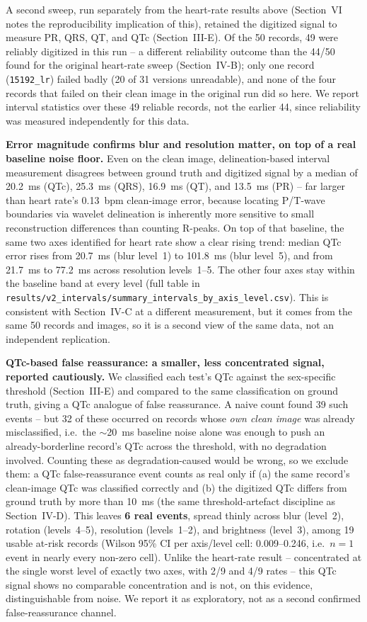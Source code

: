 \documentclass[conference]{IEEEtran}
\begin{document}
A second sweep, run separately from the heart-rate results above (Section~VI notes
the reproducibility implication of this), retained the digitized signal to measure
PR, QRS, QT, and QTc (Section~III-E). Of the 50 records, 49 were reliably digitized
in this run -- a different reliability outcome than the 44/50 found for the original
heart-rate sweep (Section~IV-B); only one record (\texttt{15192\_lr}) failed badly (20
of 31 versions unreadable), and none of the four records that failed on their clean
image in the original run did so here. We report interval statistics over these 49
reliable records, not the earlier 44, since reliability was measured independently
for this data.

\textbf{Error magnitude confirms blur and resolution matter, on top of a real
baseline noise floor.} Even on the clean image, delineation-based interval
measurement disagrees between ground truth and digitized signal by a median of
20.2~ms (QTc), 25.3~ms (QRS), 16.9~ms (QT), and 13.5~ms (PR) -- far larger than heart
rate's 0.13~bpm clean-image error, because locating P/T-wave boundaries via wavelet
delineation is inherently more sensitive to small reconstruction differences than
counting R-peaks. On top of that baseline, the same two axes identified for heart
rate show a clear rising trend: median QTc error rises from 20.7~ms (blur level~1) to
101.8~ms (blur level~5), and from 21.7~ms to 77.2~ms across resolution levels~1--5.
The other four axes stay within the baseline band at every level (full table in
\texttt{results/v2\_intervals/summary\_intervals\_by\_axis\_level.csv}). This is
consistent with Section~IV-C at a different measurement, but it comes from the same
50 records and images, so it is a second view of the same data, not an independent
replication.

\textbf{QTc-based false reassurance: a smaller, less concentrated signal, reported
cautiously.} We classified each test's QTc against the sex-specific threshold
(Section~III-E) and compared to the same classification on ground truth, giving a
QTc analogue of false reassurance. A naive count found 39 such events -- but 32 of
these occurred on records whose \emph{own clean image} was already misclassified,
i.e.\ the $\sim$20~ms baseline noise alone was enough to push an already-borderline
record's QTc across the threshold, with no degradation involved. Counting these as
degradation-caused would be wrong, so we exclude them: a QTc false-reassurance event
counts as real only if (a) the same record's clean-image QTc was classified
correctly and (b) the digitized QTc differs from ground truth by more than 10~ms
(the same threshold-artefact discipline as Section~IV-D). This leaves \textbf{6 real
events}, spread thinly across blur (level~2), rotation (levels~4--5), resolution
(levels~1--2), and brightness (level~3), among 19 usable at-risk records (Wilson 95\%
CI per axis/level cell: 0.009--0.246, i.e.\ $n=1$ event in nearly every non-zero
cell). Unlike the heart-rate result -- concentrated at the single worst level of
exactly two axes, with 2/9 and 4/9 rates -- this QTc signal shows no comparable
concentration and is not, on this evidence, distinguishable from noise. We report it
as exploratory, not as a second confirmed false-reassurance channel.
\end{document}
